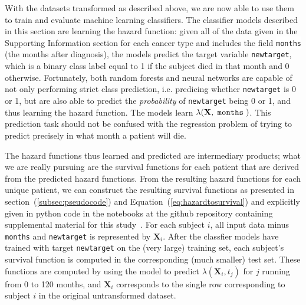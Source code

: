 \documentclass[10pt,letterpaper]{article}
\newcommand{\codewhite}[1]{\colorbox{white}{\texttt{#1}}}
\begin{document}
With the datasets transformed as described above, we are now able to use them to train and evaluate machine learning classifiers.
The classifier models described in this section are learning the hazard function: given all of the data given in the Supporting Information section for each cancer type and includes the field \codewhite{months} (the months after diagnosis), the models predict the target variable \codewhite{newtarget}, which is a binary class label equal to 1 if the subject died in that month and 0 otherwise.
Fortunately, both random forests and neural networks are capable of not only performing strict class prediction, i.e. predicing whether \codewhite{newtarget} is 0 or 1, but are also able to predict the \emph{probability} of \codewhite{newtarget} being 0 or 1, and thus learning the hazard function.
The models learn $\lambda(\mathbf{X}, \codewhite{months})$.
This prediction task should not be confused with the regression problem of trying to predict precisely in what month a patient will die.


The hazard functions thus learned and predicted are intermediary products; what we are really pursuing are the survival functions for each patient that are derived from the predicted hazard functions.
From the resulting hazard functions for each unique patient, we can construct the
resulting survival functions as presented in section~(\ref{subsec:pseudocode}) and Equation~(\ref{eq:hazardtosurvival}) and explicitly given in python code in the notebooks at the github repository containing supplemental material for this study~\cite{supp}.
For each subject $i$, all input data minus \codewhite{months} and \codewhite{newtarget} is represented by $\mathbf{X}_{i}$. After the classfier models have trained with target \codewhite{newtarget} on the (very large) training set, each subject's survival function is computed in the corresponding (much smaller) test set.
These functions are computed by using the model to predict $\lambda(\mathbf{X}_i, t_{j})$ for $j$ running from 0 to 120 months, and $\mathbf{X}_{i}$ corresponds to the single row corresponding to subject $i$ in the original untransformed dataset.
\end{document}
